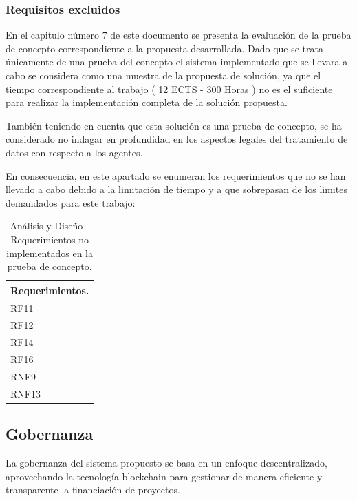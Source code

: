 \newpage

\subsubsection{Requisitos excluidos}

En el capitulo número 7 de este documento se presenta la evaluación de la prueba de concepto correspondiente a la propuesta desarrollada. Dado que se trata únicamente de una prueba del concepto el sistema implementado que se llevara a cabo se considera como una muestra de la propuesta de solución, ya que el tiempo correspondiente al trabajo ( 12 ECTS - 300 Horas ) no es el suficiente para realizar la implementación completa de la solución propuesta.

\bigskip

También teniendo en cuenta que esta solución es una prueba de concepto, se ha considerado no indagar en profundidad en los aspectos legales del tratamiento de datos con respecto a los agentes.

\bigskip

En consecuencia, en este apartado se enumeran los requerimientos que no se han llevado a cabo debido a la limitación de tiempo y a que sobrepasan de los limites demandados para este trabajo:

\begin{table}[H]
\centering
\begin{tabular}{|p{5cm}|}
\hline
    \textbf{Requerimientos.} \\
    \hline
    RF11 \\
    \hline
    RF12 \\
    \hline
    RF14 \\
    \hline
    RF16 \\
    \hline
    \hline
    RNF9 \\
    \hline
    RNF13 \\
    \hline
\end{tabular}
\caption{Análisis y Diseño - Requerimientos no implementados en la prueba de concepto.}
\label{tab:requisitos_no_funcionales}
\end{table}

\subsection{Gobernanza}

La gobernanza del sistema propuesto se basa en un enfoque descentralizado, aprovechando la tecnología blockchain para gestionar de manera eficiente y transparente la financiación de proyectos.

